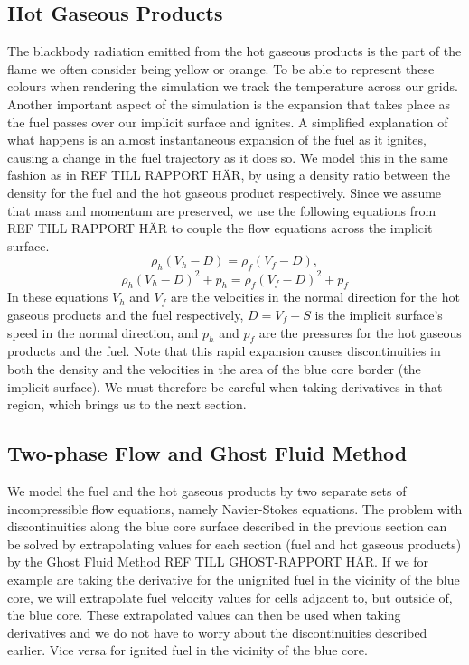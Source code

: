 \subsection{Hot Gaseous Products}
The blackbody radiation emitted from the hot gaseous products is the part of the flame we often consider being yellow or orange. To be able to represent these colours when rendering the simulation we track the temperature across our grids. Another important aspect of the simulation is the expansion that takes place as the fuel passes over our implicit surface and ignites. A simplified explanation of what happens is an almost instantaneous expansion of the fuel as it ignites, causing a change in the fuel trajectory as it does so. We model this in the same fashion as in REF TILL RAPPORT HÄR, by using a density ratio between the density for the fuel and the hot gaseous product respectively. Since we assume that mass and momentum are preserved, we use the following equations from REF TILL RAPPORT HÄR to couple the flow equations across the implicit surface.
\begin{equation}
\rho_h(V_h-D) = \rho_f(V_f-D),
\end{equation}
\begin{equation}
\rho_h(V_h-D)^2+p_h = \rho_f(V_f-D)^2+p_f
\end{equation}
In these equations $V_h$ and $V_f$ are the velocities in the normal direction for the hot gaseous products and the fuel respectively, $D = V_f+S$ is the implicit surface's speed in the normal direction, and $p_h$ and $p_f$ are the pressures for the hot gaseous products and the fuel. Note that this rapid expansion causes discontinuities in both the density and the velocities in the area of the blue core border (the implicit surface). We must therefore be careful when taking derivatives in that region, which brings us to the next section.
\subsection{Two-phase Flow and Ghost Fluid Method}
We model the fuel and the hot gaseous products by two separate sets of incompressible flow equations, namely Navier-Stokes equations. The problem with discontinuities along the blue core surface described in the previous section can be solved by extrapolating values for each section (fuel and hot gaseous products) by the Ghost Fluid Method REF TILL GHOST-RAPPORT HÄR. If we  for example are taking the derivative for the unignited fuel in the vicinity of the blue core, we will extrapolate fuel velocity values for cells adjacent to, but outside of, the blue core. These extrapolated values can then be used when taking derivatives and we do not have to worry about the discontinuities described earlier. Vice versa for ignited fuel in the vicinity of the blue core.